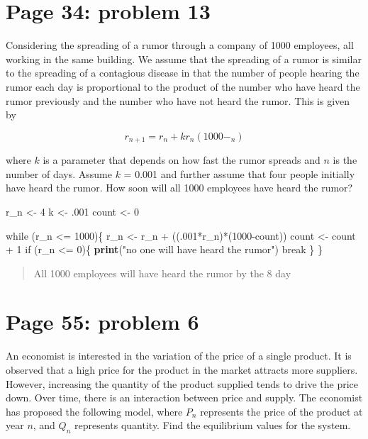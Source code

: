 \documentclass[]{article}
\newenvironment{Shaded}{\begin{snugshade}}{\end{snugshade}}
\newcommand{\KeywordTok}[1]{\textcolor[rgb]{0.13,0.29,0.53}{\textbf{{#1}}}}
\newcommand{\DecValTok}[1]{\textcolor[rgb]{0.00,0.00,0.81}{{#1}}}
\newcommand{\StringTok}[1]{\textcolor[rgb]{0.31,0.60,0.02}{{#1}}}
\newcommand{\NormalTok}[1]{{#1}}
\begin{document}
\section{Page 34: problem 13}\label{page-34-problem-13}

Considering the spreading of a rumor through a company of 1000
employees, all working in the same building. We assume that the
spreading of a rumor is similar to the spreading of a contagious disease
in that the number of people hearing the rumor each day is proportional
to the product of the number who have heard the rumor previously and the
number who have not heard the rumor. This is given by

\[r_{n+1} = r_n + kr_n(1000- _n)\]

where \(k\) is a parameter that depends on how fast the rumor spreads
and \(n\) is the number of days. Assume \(k\) = 0.001 and further assume
that four people initially have heard the rumor. How soon will all 1000
employees have heard the rumor?

\begin{Shaded}
\begin{Highlighting}[]
\NormalTok{r_n <-}\StringTok{ }\DecValTok{4}
\NormalTok{k <-}\StringTok{ }\NormalTok{.}\DecValTok{001}
\NormalTok{count <-}\StringTok{ }\DecValTok{0}

\NormalTok{while (r_n <=}\StringTok{ }\DecValTok{1000}\NormalTok{)\{}
\NormalTok{r_n <-}\StringTok{ }\NormalTok{r_n +}\StringTok{ }\NormalTok{((.}\DecValTok{001}\NormalTok{*r_n)*(}\DecValTok{1000}\NormalTok{-count))}
\NormalTok{count <-}\StringTok{ }\NormalTok{count +}\StringTok{ }\DecValTok{1}
\NormalTok{if (r_n <=}\StringTok{ }\DecValTok{0}\NormalTok{)\{}
  \KeywordTok{print}\NormalTok{(}\StringTok{"no one will have heard the rumor"}\NormalTok{)}
  \NormalTok{break}
 \NormalTok{\}}
\NormalTok{\}}
\end{Highlighting}
\end{Shaded}

\begin{quote}
All 1000 employees will have heard the rumor by the 8 day
\end{quote}

\section{Page 55: problem 6}\label{page-55-problem-6}

An economist is interested in the variation of the price of a single
product. It is observed that a high price for the product in the market
attracts more suppliers. However, increasing the quantity of the product
supplied tends to drive the price down. Over time, there is an
interaction between price and supply. The economist has proposed the
following model, where \(P_n\) represents the price of the product at
year \(n\), and \(Q_n\) represents quantity. Find the equilibrium values
for the system.
\end{document}
